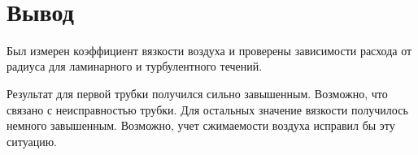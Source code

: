 \newpage ~ \newpage ~ \newpage ~ \newpage
\section{Вывод}
Был измерен коэффициент вязкости воздуха и проверены зависимости расхода от радиуса
для ламинарного и турбулентного течений.

Результат для первой трубки получился сильно завышенным. Возможно, что связано с неисправностью трубки.
Для остальных значение вязкости получилось немного завышенным.
Возможно, учет сжимаемости воздуха исправил бы эту ситуацию.
